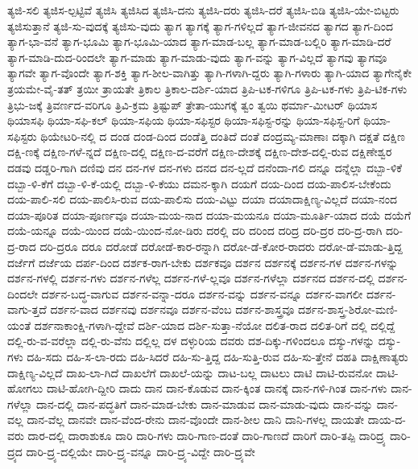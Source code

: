 {ತ್ಯಜಿ-ಸಲಿ
ತ್ಯಜಿಸ-ಲ್ಪಟ್ಟಿವೆ
ತ್ಯಜಿಸಿ
ತ್ಯಜಿಸಿದ
ತ್ಯಜಿಸಿ-ದನು
ತ್ಯಜಿಸಿ-ದರು
ತ್ಯಜಿಸಿ-ದರೆ
ತ್ಯಜಿಸಿ-ಬಿಡಿ
ತ್ಯಜಿಸಿ-ಯೇ-ಬಿಟ್ಟರು
ತ್ಯಜಿಸುತ್ತಾನೆ
ತ್ಯಜಿ-ಸು-ವುದಕ್ಕೆ
ತ್ಯಜಿಸು-ವುದು
ತ್ಯಾಗ
ತ್ಯಾಗಕ್ಕೆ
ತ್ಯಾಗ-ಗಳಿಲ್ಲದೆ
ತ್ಯಾಗ-ಜೀವನದ
ತ್ಯಾಗದ
ತ್ಯಾಗ-ದಿಂದ
ತ್ಯಾಗ-ಭಾ-ವನೆ
ತ್ಯಾಗ-ಭೂಮಿ
ತ್ಯಾಗ-ಭೂಮಿ-ಯಾದ
ತ್ಯಾಗ-ಮಾಡ-ಬಲ್ಲ
ತ್ಯಾಗ-ಮಾಡ-ಬಲ್ಲಿರಿ
ತ್ಯಾಗ-ಮಾಡಿ-ದರೆ
ತ್ಯಾಗ-ಮಾಡಿ-ದುದ-ರಿಂದಲೇ
ತ್ಯಾಗ-ಮಾಡು
ತ್ಯಾಗ-ಮಾಡು-ವುದು
ತ್ಯಾಗ-ವನ್ನು
ತ್ಯಾಗ-ವಿಲ್ಲದೆ
ತ್ಯಾಗವು
ತ್ಯಾಗವೂ
ತ್ಯಾಗವೇ
ತ್ಯಾಗ-ವೊಂದೇ
ತ್ಯಾಗ-ಶಕ್ತಿ
ತ್ಯಾಗ-ಶೀಲ-ವಾಗಿತ್ತು
ತ್ಯಾಗಿ-ಗಳಾಗಿ-ದ್ದರು
ತ್ಯಾಗಿ-ಗಳಾರು
ತ್ಯಾಗಿ-ಯಾದ
ತ್ಯಾಗೇನೈಕೇ
ತ್ರಯಮೇ-ವೈ-ತತ್
ತ್ರಯೀ
ತ್ರಾಯತೇ
ತ್ರಿಕಾಲ
ತ್ರಿಕಾಲ-ದರ್ಶಿ-ಯಾದ
ತ್ರಿಪಿ-ಟಕ-ಗಳಿಗೂ
ತ್ರಿಪಿ-ಟಕ-ಗಳು
ತ್ರಿಪಿ-ಟಿಕ-ಗಳು
ತ್ರಿಭು-ಜಕ್ಕೆ
ತ್ರಿವರ್ಣದ-ವರಿಗೂ
ತ್ರಿವಿ-ಕ್ರಮ
ತ್ರಿಷ್ಟುಪ್
ತ್ರೇತಾ-ಯುಗಕ್ಕೆ
ತ್ವಂ
ತ್ವಯಿ
ಥರ್ಮಾ-ಮೀಟರ್
ಥಿಯಾಸ
ಥಿಯಾಸಫಿ
ಥಿಯಾ-ಸಫಿ-ಕಲ್
ಥಿಯಾ-ಸಫಿಯ
ಥಿಯಾ-ಸಫಿಸ್ಟರ
ಥಿಯಾ-ಸಫಿಸ್ಟ-ರನ್ನು
ಥಿಯಾ-ಸಫಿಸ್ಟ-ರಿಗೆ
ಥಿಯಾ-ಸಫಿಸ್ಟರು
ಥಿಯೇಟರಿ-ನಲ್ಲಿ
ದ
ದಂಡ
ದಂಡ-ದಿಂದ
ದಂಡೆತ್ತಿ
ದಂತಿದೆ
ದಂತೆ
ದಂದ್ರಮ್ಯ-ಮಾಣಾಃ
ದಕ್ಕಾಗಿ
ದಕ್ಷತೆ
ದಕ್ಷಿಣ
ದಕ್ಷಿ-ಣಕ್ಕೆ
ದಕ್ಷಿಣ-ಗಳೆ-ನ್ನದೆ
ದಕ್ಷಿಣ-ದಲ್ಲಿ
ದಕ್ಷಿಣ-ದ-ವರೆಗೆ
ದಕ್ಷಿಣ-ದೇಶಕ್ಕೆ
ದಕ್ಷಿಣ-ದೇಶ-ದಲ್ಲಿ-ರುವ
ದಕ್ಷಿಣೇಶ್ವರ
ದಡವು
ದಡ್ಡರಿ-ಗಾಗಿ
ದಣಿವು
ದನ
ದನ-ಗಳ
ದನ-ಗಳು
ದನದ
ದನ-ಲ್ಲದೆ
ದನೆಂದಾ-ಗಲಿ
ದನ್ನೂ
ದನ್ನೆಲ್ಲಾ
ದಬ್ಬಾ-ಳಿಕೆ
ದಬ್ಬಾ-ಳಿ-ಕೆಗೆ
ದಬ್ಬಾ-ಳಿ-ಕೆ-ಯಲ್ಲಿ
ದಬ್ಬಾ-ಳಿ-ಕೆಯು
ದಮನ-ಕ್ಕಾಗಿ
ದಯಗೆ
ದಯ-ದಿಂದ
ದಯ-ಪಾಲಿಸ-ಬೇಕೆಂದು
ದಯ-ಪಾಲಿ-ಸಲಿ
ದಯ-ಪಾಲಿಸಿ-ರುವ
ದಯ-ಪಾಲಿಸು
ದಯ-ವಿಟ್ಟು
ದಯಾ
ದಯಾದಾಕ್ಷಿಣ್ಯ-ವಿಲ್ಲದೆ
ದಯಾ-ನಂದ
ದಯಾ-ಪೂರಿತ
ದಯಾ-ಪೂರ್ಣವೂ
ದಯಾ-ಮಯ-ನಾದ
ದಯಾ-ಮಯನೂ
ದಯಾ-ಮೂರ್ತಿ-ಯಾದ
ದಯೆ
ದಯೆಗೆ
ದಯೆ-ಯನ್ನೂ
ದಯೆ-ಯಿಂದ
ದಯೆ-ಯಿಂದ-ನೋ-ಡಿರು
ದರಲ್ಲಿ
ದರಿ
ದರಿಂದ
ದರಿದ್ರ
ದರಿ-ದ್ರರ
ದರಿ-ದ್ರ-ರಾಗಿ
ದರಿ-ದ್ರ-ರಾದ
ದರಿ-ದ್ರರೂ
ದರೂ
ದರೋಡೆ
ದರೋಡೆ-ಕಾರ-ರನ್ನಾಗಿ
ದರೋ-ಡೆ-ಕೋರ-ರಾದರು
ದರೋ-ಡೆ-ಮಾಡು-ತ್ತಿದ್ದ
ದರ್ಜೆಗೆ
ದರ್ಜೆಯ
ದರ್ಪ-ದಿಂದ
ದರ್ಶಕ-ರಾಗ-ಬೇಕು
ದರ್ಶಕವೂ
ದರ್ಶನ
ದರ್ಶನಕ್ಕೆ
ದರ್ಶನ-ಗಳ
ದರ್ಶನ-ಗಳನ್ನು
ದರ್ಶನ-ಗಳಲ್ಲಿ
ದರ್ಶನ-ಗಳು
ದರ್ಶನ-ಗಳೆಲ್ಲ
ದರ್ಶನ-ಗಳೆ-ಲ್ಲವೂ
ದರ್ಶನ-ಗಳೆಲ್ಲಾ
ದರ್ಶನದ
ದರ್ಶನ-ದಲ್ಲಿ
ದರ್ಶನ-ದಿಂದಲೇ
ದರ್ಶನ-ಬದ್ಧ-ವಾಗುವ
ದರ್ಶನ-ವನ್ನಾ-ದರೂ
ದರ್ಶನ-ವನ್ನು
ದರ್ಶನ-ವನ್ನೂ
ದರ್ಶನ-ವಾಗಲೀ
ದರ್ಶನ-ವಾಗು-ತ್ತದೆ
ದರ್ಶನ-ವಾದ
ದರ್ಶನವು
ದರ್ಶನವೂ
ದರ್ಶನ-ವೆಂಬ
ದರ್ಶನ-ಶಾಸ್ತ್ರವೂ
ದರ್ಶನ-ಶಾಸ್ತ್ರ-ಶಿರೋ-ಮಣಿ-ಯಂತೆ
ದರ್ಶನಾಕಾಂಕ್ಷಿ-ಗಳಾಗಿ-ದ್ದೇವೆ
ದರ್ಶಿ-ಯಾದ
ದರ್ಶಿ-ಸುತ್ತಾ-ನೆಯೋ
ದಲಿತ-ರಾದ
ದಲಿತ-ರಿಗೆ
ದಲ್ಲಿ
ದಲ್ಲಿದ್ದೆ
ದಲ್ಲಿ-ರು-ವ-ವರೆಲ್ಲಾ
ದಲ್ಲಿ-ರು-ವೆನು
ದಲ್ಲಿಲ್ಲ
ದಳ
ದಳ್ಳುರಿಯ
ದವರು
ದಶ-ದಿಕ್ಕು-ಗಳಿಂದಲೂ
ದಸ್ಯು-ಗಳನ್ನು
ದಸ್ಯು-ಗಳು
ದಹಿ-ಸದು
ದಹಿ-ಸ-ಲಾ-ರದು
ದಹಿ-ಸಿದರೆ
ದಹಿ-ಸು-ತ್ತಿದ್ದ
ದಹಿ-ಸುತ್ತಿ-ರುವ
ದಹಿ-ಸು-ತ್ತೇನೆ
ದಹತಿ
ದಾಕ್ಷಿಣಾತ್ಯರು
ದಾಕ್ಷಿಣ್ಯ-ವಿಲ್ಲದೆ
ದಾಖ-ಲಾ-ಗಿದೆ
ದಾಖಲೆಗೆ
ದಾಖಲೆ-ಯನ್ನು
ದಾಟ-ಬಲ್ಲ
ದಾಟಲು
ದಾಟಿ
ದಾಟಿ-ರುವನೋ
ದಾಟಿ-ಹೋಗಲು
ದಾಟಿ-ಹೋಗಿ-ದ್ದೀರಿ
ದಾದು
ದಾನ
ದಾನ-ಕೊಡುವ
ದಾನ-ಕ್ಕಿಂತ
ದಾನಕ್ಕೆ
ದಾನ-ಗಳಿ-ಗಿಂತ
ದಾನ-ಗಳು
ದಾನ-ಗಳೆಲ್ಲಾ
ದಾನ-ದಲ್ಲಿ
ದಾನ-ಪದ್ಧತಿಗೆ
ದಾನ-ಮಾಡ-ಬೇಕು
ದಾನ-ಮಾಡುವ
ದಾನ-ಮಾಡು-ವುದು
ದಾನ-ವನ್ನು
ದಾನ-ವಲ್ಲ
ದಾನ-ವೆಲ್ಲ
ದಾನವೇ
ದಾನ-ವೆಂದ-ರೇನು
ದಾನ-ವೊಂದೇ
ದಾನ-ಶೀಲ
ದಾನಿ
ದಾನಿ-ಗಳಲ್ಲ
ದಾಯತೇ
ದಾಯ-ದ-ವರು
ದಾರ-ದಲ್ಲಿ
ದಾರಾಶುಕೂ
ದಾರಿ
ದಾರಿ-ಗಳು
ದಾರಿ-ಗಾಣ-ದಂತೆ
ದಾರಿ-ಗಾಣದೆ
ದಾರಿಗೆ
ದಾರಿ-ತಪ್ಪಿ
ದಾರಿದ್ರ್ಯ
ದಾರಿ-ದ್ರ್ಯದ
ದಾರಿ-ದ್ರ್ಯ-ದಲ್ಲಿಯೇ
ದಾರಿ-ದ್ರ್ಯ-ವನ್ನೂ
ದಾರಿ-ದ್ರ್ಯ-ವಿದ್ದೇ
ದಾರಿ-ದ್ರ್ಯವೇ
}
